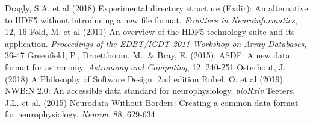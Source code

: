 \documentclass[10pt]{exam}
\newcommand\aodclass[1]{\textcolor{codeblue}{\texttt{#1}}}
\begin{document}
	\begin{thebibliography}{[20]}
			Dragly, S.A. et al (2018) Experimental directory structure (Exdir): An alternative to HDF5 without introducing a new file format. \textit{Frontiers in Neuroinformatics}, 12, 16
			Fold, M. et al (2011) An overview of the HDF5 technology suite and its application. \textit{Proceedings of the EDBT/ICDT 2011 Workshop on Array Databases}, 36-47
			Greenfield, P., Droettboom, M., \& Bray, E. (2015). ASDF: A new data format for astronomy. \textit{Astronomy and Computing}, 12: 240-251
			Osterhout, J. (2018) A Philosophy of Software Design. 2nd edition
			Rubel, O. et al (2019) NWB:N 2.0: An accessible data standard for neurophysiology. \textit{bioRxiv}
			Teeters, J.L. et al. (2015) Neurodata Without Borders: Creating a common data format for neurophysiology. \textit{Neuron}, 88, 629-634
	\end{thebibliography}



\end{document}
